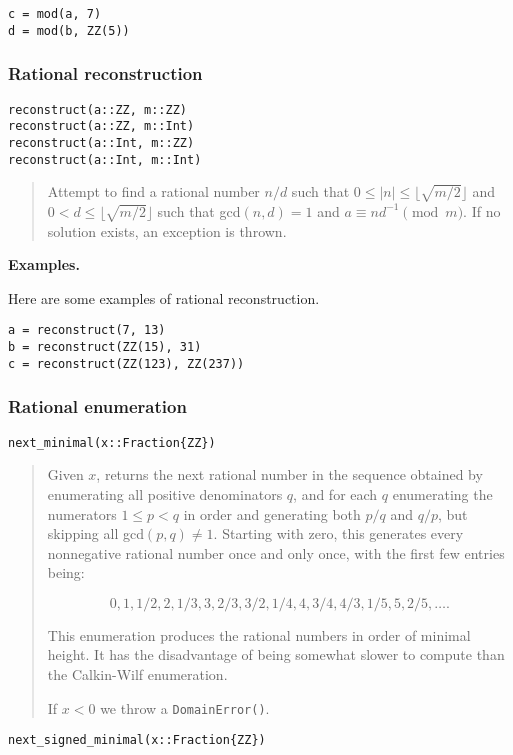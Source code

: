 \documentclass[a4paper,10pt]{article}
\newcommand{\code}{\lstinline}
\newcommand{\desc}[1]{\vspace{-3mm}\begin{quote}#1\end{quote}}
\begin{document}
{{{\begin{lstlisting}
c = mod(a, 7)
d = mod(b, ZZ(5))
\end{lstlisting}

\subsubsection{Rational reconstruction}

\begin{lstlisting}
reconstruct(a::ZZ, m::ZZ)
reconstruct(a::ZZ, m::Int)
reconstruct(a::Int, m::ZZ)
reconstruct(a::Int, m::Int)
\end{lstlisting}

\desc{Attempt to find a rational number $n/d$ such that 
$0 \leq |n| \leq \lfloor\sqrt{m/2}\rfloor$ and 
$0 < d \leq \lfloor\sqrt{m/2}\rfloor$ such that gcd$(n, d) = 1$ and
$a \equiv nd^{-1} \pmod{m}$. If no solution exists, an exception is thrown.}

\textbf{Examples.}

Here are some examples of rational reconstruction.

\begin{lstlisting}
a = reconstruct(7, 13)
b = reconstruct(ZZ(15), 31)
c = reconstruct(ZZ(123), ZZ(237))
\end{lstlisting}

\subsubsection{Rational enumeration}

\begin{lstlisting}
next_minimal(x::Fraction{ZZ})
\end{lstlisting}

\desc{Given $x$, returns the next rational number in the sequence obtained by
enumerating all positive denominators $q$, and for each $q$ enumerating
the numerators $1 \le p < q$ in order and generating both $p/q$ and $q/p$,
but skipping all gcd$(p,q) \neq 1$. Starting with zero, this generates
every nonnegative rational number once and only once, with the first
few entries being:

$$0, 1, 1/2, 2, 1/3, 3, 2/3, 3/2, 1/4, 4, 3/4, 4/3, 1/5, 5, 2/5, \ldots.$$

This enumeration produces the rational numbers in order of minimal height. 
It has the disadvantage of being somewhat slower to compute than the
Calkin-Wilf enumeration.

If $x < 0$ we throw a \code{DomainError()}.}

\begin{lstlisting}
next_signed_minimal(x::Fraction{ZZ})
\end{lstlisting}

}}}
\end{document}
